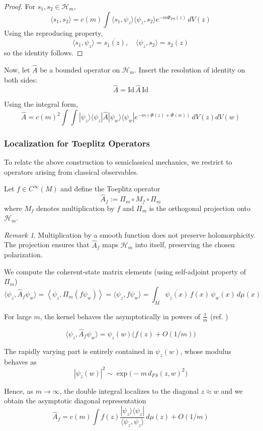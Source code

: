 \documentclass[
  12pt,
  a4paper, oneside
]{report}
\theoremstyle{bolddef}
\theoremstyle{remark}
\newtheorem{remark}[theorem]{Remark}
\numberwithin{equation}{chapter}
\begin{document}
\begin{proof}
For $s_1,s_2 \in \mathcal H_m$,
$$
\langle s_1 , s_2 \rangle
=
c(m)
\int
\langle s_1,\psi_z\rangle
\langle\psi_z,s_2\rangle
e^{-m\Phi_{FS}(z)}\, dV(z)
$$
Using the reproducing property,
$$
\langle s_1,\psi_z\rangle = \overline{s_1(z)}, 
\quad
\langle\psi_z,s_2\rangle = s_2(z)
$$
so the identity follows.
\end{proof}

Now, let $\hat A$ be a bounded operator on $\mathcal H_m$.
Insert the resolution of identity on both sides:
$$
\hat A
=
\mathrm{Id}\,\hat A\,\mathrm{Id}
$$

Using the integral form,
$$
\hat A
=
c(m)^2
\int\!\!\int
|\psi_z\rangle
\langle\psi_z|\hat A|\psi_w\rangle
\langle\psi_w|
e^{-m(\Phi(z)+\Phi(w))}
\, dV(z)dV(w)
$$
\subsubsection*{Localization for Toeplitz Operators}

To relate the above construction to semiclassical mechanics,
we restrict to operators arising from classical observables.

Let $f \in C^\infty(M)$ and define the Toeplitz operator
$$
\hat A_f := \Pi_m \circ M_f \circ \Pi_m
$$
where $M_f$ denotes multiplication by $f$
and $\Pi_m$ is the orthogonal projection onto $\mathcal H_m$.

\begin{remark}
Multiplication by a smooth function does not preserve holomorphicity.
The projection ensures that $\hat A_f$ maps $\mathcal H_m$
into itself, preserving the chosen polarization.
\end{remark}

We compute the coherent-state matrix elements (using self-adjoint property of $\Pi_{m}$)
$$
\langle \psi_z , \hat A_f \psi_w \rangle
= \left\langle \psi_{z},\Pi_{m}(f\psi_{w}) \right\rangle =
\langle \psi_z , f \psi_w \rangle
=
\int_M \overline{\psi_z(x)}\, f(x)\, \psi_w(x)\, d\mu(x)
$$

For large $m$, the kernel behaves the asymptotically in powers of $\frac{1}{m}$ (ref. \cite{BMS1994})

$$
\langle \psi_z , \hat A_f \psi_w \rangle
=
\psi_z(w)\Big(f(z) + O(1/m)\Big)
$$

The rapidly varying part is entirely contained in $\psi_z(w)$,
whose modulus behaves as
$$
|\psi_z(w)|^2
\sim
\exp\!\big(-m\, d_{FS}(z,w)^2\big)
$$

Hence, as $m \to \infty$, the double integral localizes
to the diagonal $z \approx w$ and we obtain the asymptotic
diagonal representation
$$
\hat A_f
=
c(m)
\int
f(z)
\frac{|\psi_z\rangle\langle\psi_z|}
{\langle\psi_z,\psi_z\rangle}
\, d\mu(z)
+
O(1/m)
$$
\end{document}
